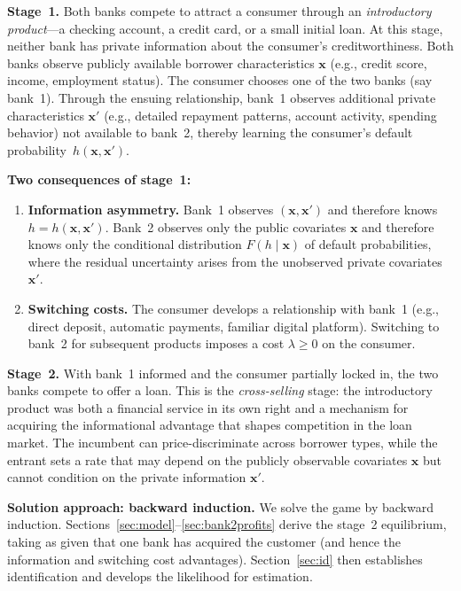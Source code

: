 \documentclass[12pt]{article}
\theoremstyle{plain}
\theoremstyle{plain}
\theoremstyle{definition}  %
\theoremstyle{remark}  %
\begin{document}
\medskip\noindent
\textbf{Stage~1.} Both banks compete to attract a consumer through an \emph{introductory product}---a checking account, a credit card, or a small initial loan. At this stage, neither bank has private information about the consumer's creditworthiness. Both banks observe publicly available borrower characteristics $\mathbf{x}$ (e.g., credit score, income, employment status). The consumer chooses one of the two banks (say bank~1). Through the ensuing relationship, bank~1 observes additional private characteristics $\mathbf{x}'$ (e.g., detailed repayment patterns, account activity, spending behavior) not available to bank~2, thereby learning the consumer's default probability~$h(\mathbf{x}, \mathbf{x}')$.

\medskip\noindent
\textbf{Two consequences of stage~1:}
\begin{enumerate}
    \item \textbf{Information asymmetry.} Bank~1 observes $(\mathbf{x}, \mathbf{x}')$ and therefore knows $h = h(\mathbf{x}, \mathbf{x}')$. Bank~2 observes only the public covariates $\mathbf{x}$ and therefore knows only the conditional distribution $F(h \mid \mathbf{x})$ of default probabilities, where the residual uncertainty arises from the unobserved private covariates $\mathbf{x}'$.
    \item \textbf{Switching costs.} The consumer develops a relationship with bank~1 (e.g., direct deposit, automatic payments, familiar digital platform). Switching to bank~2 for subsequent products imposes a cost $\lambda \geq 0$ on the consumer.
\end{enumerate}

\medskip\noindent
\textbf{Stage~2.} With bank~1 informed and the consumer partially locked in, the two banks compete to offer a loan. This is the \emph{cross-selling} stage: the introductory product was both a financial service in its own right and a mechanism for acquiring the informational advantage that shapes competition in the loan market. The incumbent can price-discriminate across borrower types, while the entrant sets a rate that may depend on the publicly observable covariates $\mathbf{x}$ but cannot condition on the private information $\mathbf{x}'$.

\medskip\noindent
\textbf{Solution approach: backward induction.} We solve the game by backward induction. Sections~\ref{sec:model}--\ref{sec:bank2profits} derive the stage~2 equilibrium, taking as given that one bank has acquired the customer (and hence the information and switching cost advantages). Section~\ref{sec:id} then establishes identification and develops the likelihood for estimation.
\end{document}
